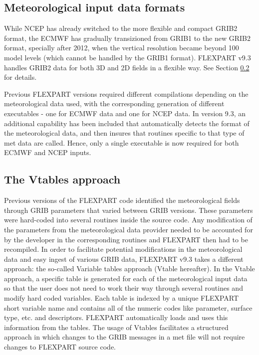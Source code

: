 \documentclass{egu}                  %
\begin{document}
\subsection{Meteorological input data formats}

While NCEP has already switched to the more flexible and compact GRIB2 format,
the ECMWF has gradually transizioned from GRIB1 to the new GRIB2 format, specially after 2012, when the vertical resolution became beyond 100 model levels (which cannot be handled by the GRIB1 format). FLEXPART v9.3 handles GRIB2 data for both 3D and 2D fields in a flexible way. See Section \ref{sec:vtables} for details. 

Previous FLEXPART versions required different compilations depending on the meteorological data used, with the corresponding generation of different executables - one for ECMWF data and one for NCEP data. In version 9.3, an additional capability has been included that automatically detects the format of the meteorological data, and then insures that routines specific to that type of met data are called.  Hence, only a single executable is now required for both ECMWF and NCEP inputs.


\subsection{The Vtables approach} \label{sec:vtables}

Previous versions of the FLEXPART code identified the meteorological fields through GRIB parameters that varied between GRIB versions. These parameters were hard-coded into several routines inside the source code. Any modification of the parameters from the meteorological data provider needed to be accounted for by the developer in the corresponding routines and FLEXPART then had to be recompiled. In order to facilitate potential modifications in the meteorological data and easy ingest of various GRIB data, FLEXPART v9.3 takes a different approach: the so-called Variable tables approach (Vtable hereafter). In the Vtable approach, a specific table is generated for each of the meteorological input data so that the user does not need to work their way through several routines and modify hard coded variables. Each table is indexed by a unique FLEXPART short variable name and contains all of the numeric codes like parameter, surface type, etc. and descriptors.  FLEXPART automatically loads and uses this information from the tables.  The usage of Vtables facilitates a structured approach in which changes to the GRIB messages in a met file will not require changes to FLEXPART source code.    
\end{document}
